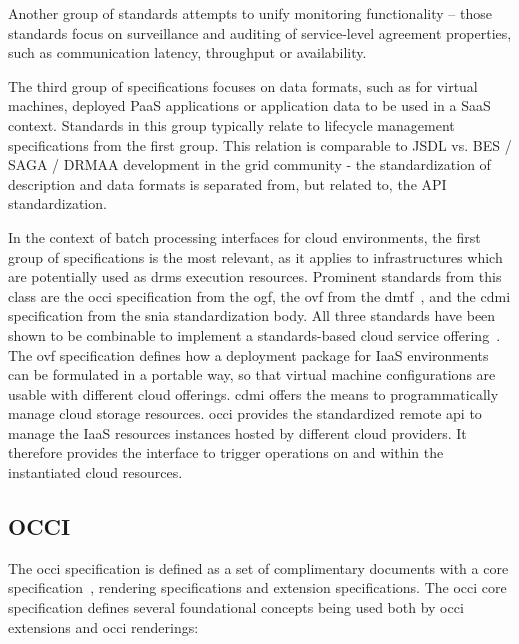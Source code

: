\documentclass[twocolumn]{svjour3}       %
\begin{document}
Another group of standards attempts to unify monitoring functionality -- those standards focus on surveillance and auditing of service-level agreement properties, such as communication latency, throughput or availability.

The third group of specifications focuses on data formats, such as for virtual machines, deployed PaaS applications or application data to be used in a SaaS context. Standards in this group typically relate to lifecycle management specifications from the first group. This relation is comparable to JSDL vs. BES / SAGA / DRMAA development in the grid community - the standardization of description and data formats is separated from, but related to, the API standardization. 

In the context of batch processing interfaces for cloud environments, the first group of specifications is the most relevant, as it applies to infrastructures which are potentially used as \gls{drms} execution resources. Prominent standards from this class are the \gls{occi} specification from the \gls{ogf}, the \gls{ovf} from the \gls{dmtf}~\cite{citemaster_9644}, and the \gls{cdmi} specification from the \gls{snia} standardization body. All three standards have been shown to be combinable to implement a standards-based cloud service offering~\cite{citemaster_9645}. The \gls{ovf} specification defines how a deployment package for IaaS environments can be formulated in a portable way, so that virtual machine configurations are usable with different cloud offerings. \gls{cdmi} offers the means to programmatically manage cloud storage resources. \gls{occi} provides the standardized remote \gls{api} to manage the IaaS resources instances hosted by different cloud providers. It therefore provides the interface to trigger operations on and within the instantiated cloud resources. 



\subsection{OCCI}

The \gls{occi} specification is defined as a set of complimentary documents with a core specification~\cite{citemaster_9270}, rendering specifications and extension specifications. The \gls{occi} core specification defines several foundational concepts being used both by \gls{occi} extensions and \gls{occi} renderings:
\end{document}
